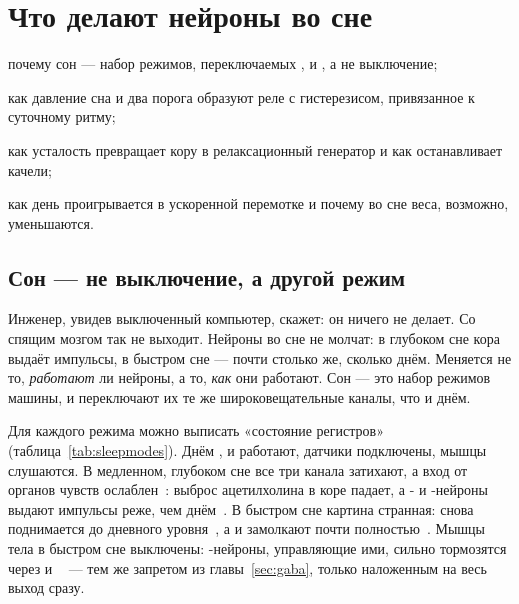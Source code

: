 \chapter{Что делают нейроны во сне}
\label{sec:sleep}
\begin{chaptergoals}
\item почему сон --- набор режимов, переключаемых ,  и , а не выключение;
\item как давление сна и два порога образуют реле с гистерезисом, привязанное к суточному ритму;
\item как усталость превращает кору в релаксационный генератор и как  останавливает качели;
\item как день проигрывается в ускоренной перемотке и почему во сне веса, возможно, уменьшаются.
\end{chaptergoals}

\section{Сон --- не выключение, а другой режим}

Инженер, увидев выключенный компьютер, скажет: он ничего не делает. Со спящим мозгом так не выходит. Нейроны во сне не молчат: в глубоком сне кора выдаёт импульсы, в быстром сне --- почти столько же, сколько днём. Меняется не то, \emph{работают} ли нейроны, а то, \emph{как} они работают. Сон --- это набор режимов машины, и переключают их те же широковещательные каналы, что и днём.

Для каждого режима можно выписать «состояние регистров» (таблица~\ref{tab:sleepmodes}). Днём ,  и  работают, датчики подключены, мышцы слушаются. В медленном, глубоком сне все три канала затихают, а вход от органов чувств ослаблен~\cite{Hasselmo1999}: выброс ацетилхолина в коре падает, а - и -нейроны выдают импульсы реже, чем днём~\cite{Marrosu1995,AstonJonesBloom1981,McGintyHarper1976}. В быстром сне картина странная:  снова поднимается до дневного уровня~\cite{Marrosu1995}, а  и  замолкают почти полностью~\cite{AstonJonesBloom1981,McGintyHarper1976,JacobsAzmitia1992}. Мышцы тела в быстром сне выключены: -нейроны, управляющие ими, сильно тормозятся через  и ~\cite{BrooksPeever2012} --- тем же запретом из главы~\ref{sec:gaba}, только наложенным на весь выход сразу.

